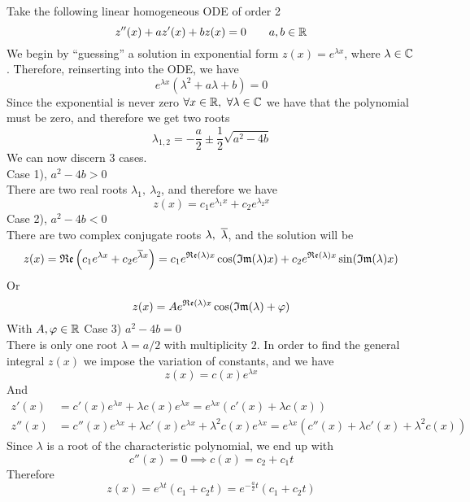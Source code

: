 \documentclass[../complete.tex]{subfiles}
\begin{document}
\begin{mtd}
	Take the following linear homogeneous ODE of order 2
	\begin{equation*}
		z''(x)+az'(x)+bz(x)=0\qquad a,b\in\mathbb{R}
	\end{equation*}
	We begin by ``guessing'' a solution in exponential form $z(x)=e^{\lambda x}$, where $\lambda\in\mathbb{C}$. Therefore, reinserting into the ODE, we have
	\begin{equation*}
		e^{\lambda x}\left( \lambda^2+a\lambda+b \right)=0
	\end{equation*}
	Since the exponential is never zero $\forall x\in\mathbb{R},\ \forall\lambda\in\mathbb{C}$ we have that the polynomial must be zero, and therefore we get two roots
	\begin{equation*}
		\lambda_{1,2}=-\frac{a}{2}\pm\frac{1}{2}\sqrt{a^2-4b}
	\end{equation*}
	We can now discern 3 cases.\\
	Case 1), $a^2-4b>0$\\
	There are two real roots $\lambda_1,\ \lambda_2$, and therefore we have
	\begin{equation*}
		z(x)=c_1e^{\lambda_1x}+c_2e^{\lambda_2x}
	\end{equation*}
	Case 2), $a^2-4b<0$\\
	There are two complex conjugate roots $\lambda,\ \overline{\lambda}$, and the solution will be
	\begin{equation*}
		z(x)=\mathfrak{Re}\left( c_1e^{\lambda x}+c_2e^{\overline{\lambda}x} \right)=c_1e^{\mathfrak{Re}(\lambda)x}\cos(\mathfrak{Im}(\lambda)x)+c_2e^{\mathfrak{Re}(\lambda)x}\sin(\mathfrak{Im}(\lambda)x)
	\end{equation*}
	Or
	\begin{equation*}
		z(x)=Ae^{\mathfrak{Re}(\lambda)x}\cos(\mathfrak{Im}(\lambda)+\varphi)
	\end{equation*}
	With $A,\varphi\in\mathbb{R}$
	Case 3) $a^2-4b=0$\\
	There is only one root $\lambda=a/2$ with multiplicity $2$. In order to find the general integral $z(x)$ we impose the variation of constants, and we have
	\begin{equation*}
		z(x)=c(x)e^{\lambda x}
	\end{equation*}
	And
	\begin{equation*}
		\begin{aligned}
			z'(x)&=c'(x)e^{\lambda x}+\lambda c(x)e^{\lambda x}=e^{\lambda x}(c'(x)+\lambda c(x))\\
			z''(x)&=c''(x)e^{\lambda x}+\lambda c'(x)e^{\lambda x}+\lambda^2 c(x)e^{\lambda x}=e^{\lambda x}(c''(x)+\lambda c'(x)+\lambda^2c(x))
		\end{aligned}
	\end{equation*}
	Since $\lambda$ is a root of the characteristic polynomial, we end up with
	\begin{equation*}
		c''(x)=0\implies c(x)=c_2+c_1t
	\end{equation*}
	Therefore
	\begin{equation*}
		z(x)=e^{\lambda t}(c_1+c_2t)=e^{-\frac{a}{2}t}(c_1+c_2t)
	\end{equation*}
\end{mtd}
\end{document}
